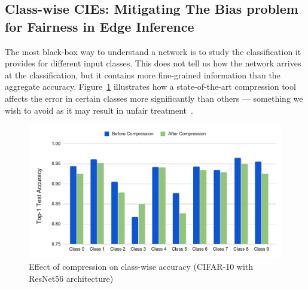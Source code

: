 \subsection{Class-wise CIEs: Mitigating The Bias problem for Fairness in Edge Inference}
The most black-box way to understand a network is to study the classification it provides for different input classes.  This does not tell us how the network arrives at the classification, but it contains more fine-grained information than the aggregate accuracy.  Figure~\ref{fig:r56Output-class-wise} illustrates 
how a state-of-the-art compression tool~\cite{joseph2019programmable} affects the error in certain classes more significantly than others --- something we wish to avoid as it may result in unfair treatment~\cite{hooker2019selective}. 

\begin{figure}[!h]
    \centering
    \includegraphics[width=\linewidth,clip,trim=0 .25in 0 0]{img/class-impact.pdf}
    \caption{\small Effect of compression on class-wise accuracy (CIFAR-10 with ResNet56 architecture)}
    \label{fig:r56Output-class-wise}
\end{figure}

